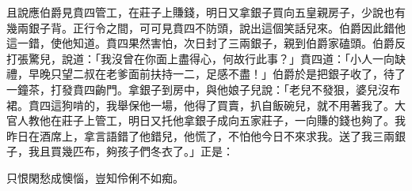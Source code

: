 且說應伯爵見賁四管工，在莊子上賺錢，明日又拿銀子買向五皇親房子，少說也有幾兩銀子背。正行令之間，可可見賁四不防頭，說出這個笑話兒來。伯爵因此錯他這一錯，使他知道。賁四果然害怕，次日封了三兩銀子，親到伯爵家磕頭。伯爵反打張驚兒，說道：「我沒曾在你面上盡得心，何故行此事？」賁四道：「小人一向缺禮，早晚只望二叔在老爹面前扶持一二，足感不盡！」伯爵於是把銀子收了，待了一鐘茶，打發賁四齣門。拿銀子到房中，與他娘子兒說：「老兒不發狠，婆兒沒布裙。賁四這狗啃的，我舉保他一場，他得了買賣，扒自飯碗兒，就不用著我了。大官人教他在莊子上管工，明日又托他拿銀子成向五家莊子，一向賺的錢也夠了。我昨日在酒席上，拿言語錯了他錯兒，他慌了，不怕他今日不來求我。送了我三兩銀子，我且買幾匹布，夠孩子們冬衣了。」正是：

只恨閑愁成懊惱，豈知伶俐不如痴。

